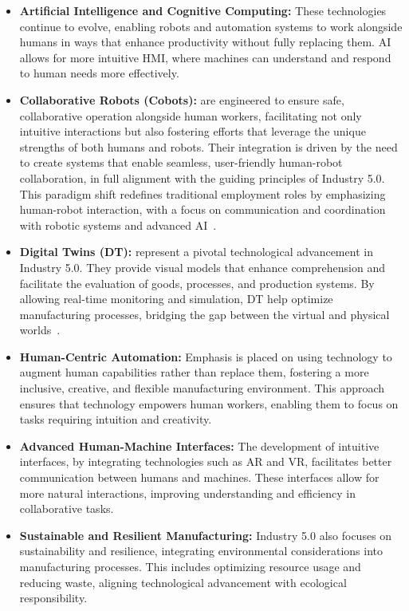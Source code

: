 \begin{itemize}
    \item \textbf{Artificial Intelligence and Cognitive Computing:} These technologies continue to evolve, enabling robots and automation systems to work alongside humans in ways that enhance productivity without fully replacing them. \ac{AI} allows for more intuitive \ac{HMI}, where machines can understand and respond to human needs more effectively.

    \item \textbf{Collaborative Robots (Cobots):} are engineered to ensure safe, collaborative operation alongside human workers, facilitating not only intuitive interactions but also fostering efforts that leverage the unique strengths of both humans and robots. Their integration is driven by the need to create systems that enable seamless, user-friendly human-robot collaboration, in full alignment with the guiding principles of Industry 5.0. This paradigm shift redefines traditional employment roles by emphasizing human-robot interaction, with a focus on communication and coordination with robotic systems and advanced \ac{AI}~\cite{10577684}.

    \item \textbf{Digital Twins (\ac{DT}):} represent a pivotal technological advancement in Industry 5.0. They provide visual models that enhance comprehension and facilitate the evaluation of goods, processes, and production systems. By allowing real-time monitoring and simulation, \ac{DT} help optimize manufacturing processes, bridging the gap between the virtual and physical worlds~\cite{10577684}.

    \item \textbf{Human-Centric Automation:} Emphasis is placed on using technology to augment human capabilities rather than replace them, fostering a more inclusive, creative, and flexible manufacturing environment. This approach ensures that technology empowers human workers, enabling them to focus on tasks requiring intuition and creativity.

    \item \textbf{Advanced Human-Machine Interfaces:} The development of intuitive interfaces, by integrating technologies such as \ac{AR} and \ac{VR}, facilitates better communication between humans and machines. These interfaces allow for more natural interactions, improving understanding and efficiency in collaborative tasks.

    \item \textbf{Sustainable and Resilient Manufacturing:} Industry 5.0 also focuses on sustainability and resilience, integrating environmental considerations into manufacturing processes. This includes optimizing resource usage and reducing waste, aligning technological advancement with ecological responsibility.
\end{itemize}

